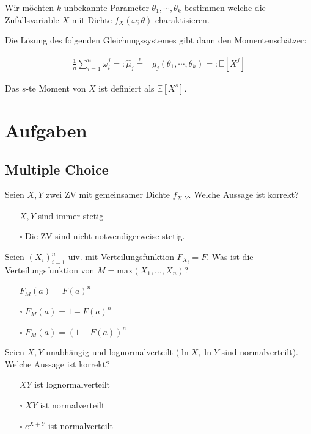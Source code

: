 \documentclass[a4paper,10pt]{article}
\def\E{\mathbb{E}}
\begin{document}
Wir möchten $k$ unbekannte Parameter $\theta_1, \cdots, \theta_k$ bestimmen welche die Zufallsvariable $X$ mit Dichte $f_X(\omega; \theta)$ charaktisieren.

Die Lösung des folgenden Gleichungssystemes gibt dann den Momentenschätzer:

\begin{align*}
	\frac{1}{n} \sum_{i=1}^n \omega_i^j =: \hat{\mu}_j \overset{!}{=} & g_j(\theta_1, \cdots, \theta_k) =: \E[X^j]
\end{align*}

Das $s$-te Moment von $X$ ist definiert als $\E[X^s]$.

\section{Aufgaben}
\subsection{Multiple Choice}

Seien \(X,Y\) zwei ZV mit gemeinsamer Dichte \(f_{X,Y}\). Welche Aussage ist korrekt?
\begin{itemize}
	\item[\checkmark] \(X,Y\) sind immer stetig
	\item[\(\square\)] Die ZV sind nicht notwendigerweise stetig.
\end{itemize}

\noindent
Seien \((X_i)_{i = 1}^n\) uiv. mit Verteilungsfunktion \(F_{X_i} = F\). Was ist die Verteilungsfunktion von \(M = \text{max}(X_1,...,X_n)\)?
\begin{itemize}
	\item[\checkmark] \(F_M(a) = F(a)^n\)
	\item[\(\square\)] \(F_M(a) = 1 - F(a)^n\)
	\item[\(\square\)] \(F_M(a) = (1 - F(a))^n\)
\end{itemize}

\noindent
Seien \(X, Y\) unabhängig und lognormalverteilt (\(\ln X, \ln Y\) sind normalverteilt). Welche Aussage ist korrekt?
\begin{itemize}
	\item[\checkmark] \(XY\) ist lognormalverteilt
	\item[\(\square\)] \(XY\) ist normalverteilt
	\item[\(\square\)] \(e^{X + Y}\) ist normalverteilt
\end{itemize}
\end{document}
